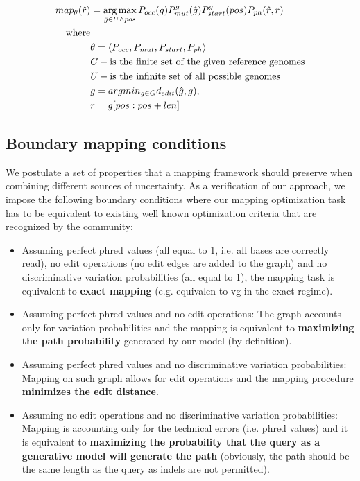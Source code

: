 \begin{align*}
	map_{\theta}(\hat{r}) &= \operatorname*{arg\,max}_{\hat{g} \in U \wedge pos} P_{occ}(g) P_{mut}^{g}(\hat{g}) P_{start}^{g}(pos) P_{ph}(\hat{r}, r) \\
			\text{where}& \\
			& \theta = \langle P_{occ}, P_{mut}, P_{start}, P_{ph} \rangle \\
			& G - \text{is the finite set of the given reference genomes} \\
			& U - \text{is the infinite set of all possible genomes} \\
			& g = argmin_{g \in G} d_{edit}(\hat{g}, g), \\
			& r = g[pos : pos+len] \\
\end{align*}

\subsection{Boundary mapping conditions}
We postulate a set of properties that a mapping framework should preserve when combining different sources of uncertainty. 
As a verification of our approach, we impose the following boundary conditions where our mapping optimization task has to be equivalent to existing well known optimization criteria that are recognized by the community:
\begin{itemize}
	\item Assuming perfect phred values (all equal to 1, i.e. all bases are correctly read), no edit operations (no edit edges are added to the graph) and no discriminative variation probabilities (all equal to 1), the mapping task is equivalent to \textbf{exact mapping} (e.g. equivalen to vg\cite{VGtool} in the exact regime).
	\item Assuming perfect phred values and no edit operations: The graph accounts only for variation probabilities and the mapping is equivalent to \textbf{maximizing the path probability} generated by our model (by definition).
	\item Assuming perfect phred values and no discriminative variation probabilities: Mapping on such graph allows for edit operations and the mapping procedure \textbf{minimizes the edit distance}.
	\item Assuming no edit operations and no discriminative variation probabilities: Mapping is accounting only for the technical errors (i.e. phred values) and it is equivalent to \textbf{maximizing the probability that the query as a generative model will generate the path} (obviously, the path should be the same length as the query as indels are not permitted).
\end{itemize}

